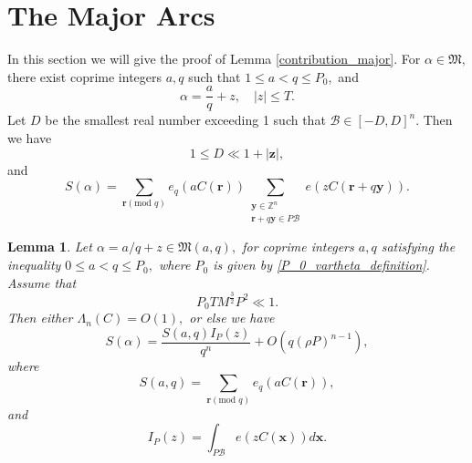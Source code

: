 \documentclass[12pt]{amsart}
\newtheorem{lemma}[theorem]{Lemma}
\theoremstyle{definition}
\numberwithin{equation}{section}
\begin{document}
\section{The Major Arcs}

In this section we will give the proof of Lemma \ref{contribution_major}. For $\alpha \in \mathfrak{M},$ there exist coprime integers $a, q$ such that $1 \leq a < q \leq P_0,$ and
\begin{equation*}
    \alpha=\frac{a}{q}+ z, \quad |z| \leq T.
\end{equation*}
Let $D$ be the smallest real number exceeding 1 such that $\mathscr{B} \in [-D, D]^n.$ Then we have
\begin{equation}
    1 \leq D \ll 1+|\boldsymbol{z}|,
\end{equation}
and
\begin{equation}
    S(\alpha)=\sum_{\boldsymbol{r}(\text{mod }q)} e_q(aC(\boldsymbol{r}))\sum_{\substack{\boldsymbol{y} \in \mathbb{Z}^n\\[3pt]\boldsymbol{r}
    +q\boldsymbol{y} \in P\mathscr{B}}} e(zC(\boldsymbol{r}
    +q\boldsymbol{y})).
\end{equation}

\begin{lemma}
    \label{lemma_5_1}
    Let $\alpha=a/q+ z \in \mathfrak{M}(a,q),$ for coprime integers $a,q$ satisfying the inequality $0 \leq a<q \leq P_0,$ where $P_0$ is given by \eqref{P_0_vartheta_definition}. Assume that  
    \begin{equation}
    \label{Not very important}
        P_0TM^{\frac{3}{2}}P^2 \ll 1.
    \end{equation}
    Then either $\Lambda_n(C)=O(1),$ or else we have
    \begin{equation*}
        S(\alpha)=\frac{S(a,q)I_P(z)}{q^n}+O\left(q(\rho P)^{n-1}\right),
    \end{equation*}
    where 
    \begin{equation*}
        S(a,q)=\sum_{\boldsymbol{r}(\text{mod }q)} e_q(aC(\boldsymbol{r})),
    \end{equation*}
    and
    \begin{equation*}
        I_P(z)=\int_{P\mathscr{B}} e(zC(\boldsymbol{x})) d\boldsymbol{x}.
    \end{equation*}
\end{lemma}
\end{document}
